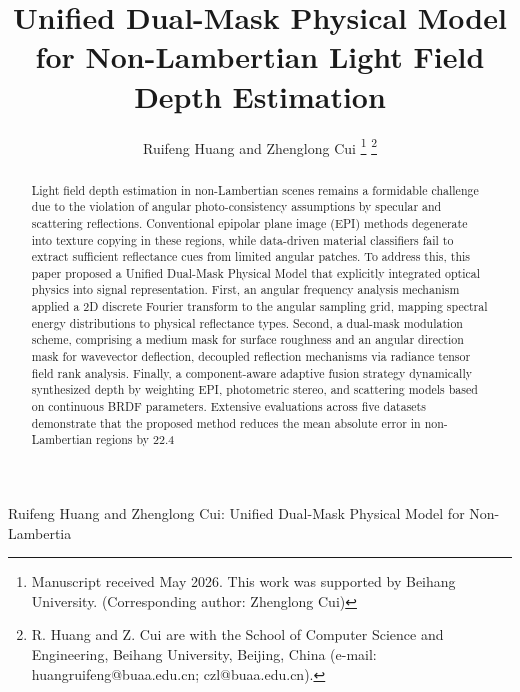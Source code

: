 \documentclass[lettersize,journal]{IEEEtran}
\begin{document}
\title{Unified Dual-Mask Physical Model for Non-Lambertian Light Field Depth Estimation}

\author{Ruifeng Huang and Zhenglong Cui
\thanks{Manuscript received May 2026. This work was supported by Beihang University. (Corresponding author: Zhenglong Cui)}
\thanks{R. Huang and Z. Cui are with the School of Computer Science and Engineering, Beihang University, Beijing, China (e-mail: huangruifeng@buaa.edu.cn; czl@buaa.edu.cn).}}

%
{Ruifeng Huang and Zhenglong Cui: Unified Dual-Mask Physical Model for Non-Lambertia}

\maketitle

\begin{abstract}
Light field depth estimation in non-Lambertian scenes remains a formidable challenge due to the violation of angular photo-consistency assumptions by specular and scattering reflections. Conventional epipolar plane image (EPI) methods degenerate into texture copying in these regions, while data-driven material classifiers fail to extract sufficient reflectance cues from limited angular patches. To address this, this paper proposed a Unified Dual-Mask Physical Model that explicitly integrated optical physics into signal representation. First, an angular frequency analysis mechanism applied a 2D discrete Fourier transform to the angular sampling grid, mapping spectral energy distributions to physical reflectance types. Second, a dual-mask modulation scheme, comprising a medium mask for surface roughness and an angular direction mask for wavevector deflection, decoupled reflection mechanisms via radiance tensor field rank analysis. Finally, a component-aware adaptive fusion strategy dynamically synthesized depth by weighting EPI, photometric stereo, and scattering models based on continuous BRDF parameters. Extensive evaluations across five datasets demonstrate that the proposed method reduces the mean absolute error in non-Lambertian regions by 22.4%
\end{abstract}
\end{document}
